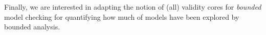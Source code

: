 Finally, we are interested in adapting the notion of (all) validity cores for \emph{bounded} model checking for quantifying how much of models have been explored by bounded analysis.
